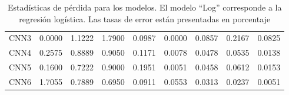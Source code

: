 \documentclass[11pt]{article}
\begin{document}
\begin{table}[H]
\begin{tabular}{c| p{1.5cm}| p{1.5cm}| p{1.5cm}| p{1.5cm}| p{1.5cm}| p{1.5cm}| p{1.5cm}| p{1.5cm}}
        CNN3 & 0.0000 &     1.1222 &             1.7900 &            0.0987 & 0.0000 &    0.0857 &            0.2167 &           0.0825 \\
        CNN4 & 0.2575 &     0.8889 &             0.9050 &            0.1171 & 0.0078 &    0.0478 &            0.0535 &           0.0138 \\
        CNN5 & 0.1600 &     0.7222 &             0.9000 &            0.1951 & 0.0051 &    0.0458 &            0.0612 &           0.0153 \\
        CNN6 & 1.7055 &     0.7889 &             0.6950 &            0.0911 & 0.0553 &    0.0313 &            0.0237 &           0.0051 \\
        \bottomrule
        \end{tabular}
        \caption{Estadísticas de pérdida para los modelos. El modelo ``Log'' corresponde a la regresión logística. Las tasas de error están presentadas en porcentaje}
    \label{tab:fullErrors}
\end{table}
\end{document}
